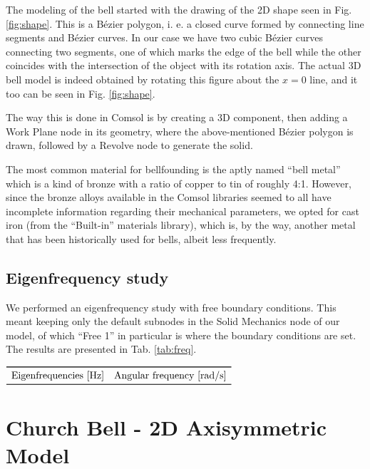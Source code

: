 \documentclass[a4paper]{article}
\begin{document}
The modeling of the bell started with the drawing of the 2D shape seen in Fig. \ref{fig:shape}. This is a Bézier polygon, i. e. a closed curve formed by connecting line segments and Bézier curves. In our case we have two cubic Bézier curves connecting two segments, one of which marks the edge of the bell while the other coincides with the intersection of the object with its rotation axis. The actual 3D bell model is indeed obtained by rotating this figure about the $x=0$ line, and it too can be seen in Fig. \ref{fig:shape}.

The way this is done in Comsol is by creating a 3D component, then adding a Work Plane node in its geometry, where the above-mentioned Bézier polygon is drawn, followed by a Revolve node to generate the solid.

The most common material for bellfounding is the aptly named ``bell metal'' which is a kind of bronze with a ratio of copper to tin of roughly 4:1. However, since the bronze alloys available in the Comsol libraries seemed to all have incomplete information regarding their mechanical parameters, we opted for cast iron (from the ``Built-in'' materials library), which is, by the way, another metal that has been historically used for bells, albeit less frequently.

\subsection{Eigenfrequency study}

We performed an eigenfrequency study with free boundary conditions. This meant keeping only the default subnodes in the Solid Mechanics node of our model, of which ``Free 1'' in particular is where the boundary conditions are set. The results are presented in Tab. \ref{tab:freq}.

\begin{table}[h]
	\centering
	$\begin{array}{ll}
		\toprule
		\text{Eigenfrequencies [Hz]} & \text{Angular frequency [rad/s]}\\
		
		\bottomrule
	\end{array}$
	\caption{}
	\label{tab:freq}
\end{table}



\section{Church Bell - 2D Axisymmetric Model}
\end{document}
